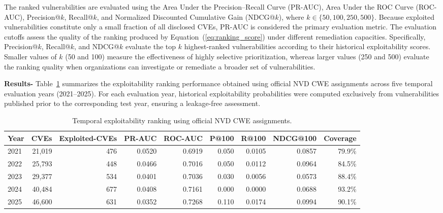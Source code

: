 \documentclass[conference,compsoc]{IEEEtran}
\begin{document}
The ranked vulnerabilities are evaluated using the Area Under the Precision--Recall Curve (PR-AUC), Area Under the ROC Curve (ROC-AUC), Precision@$k$, Recall@$k$, and Normalized Discounted Cumulative Gain (NDCG@$k$), where $k \in \{50,100,250,500\}$. Because exploited vulnerabilities constitute only a small fraction of all disclosed CVEs, PR-AUC is considered the primary evaluation metric. The evaluation cutoffs assess the quality of the ranking produced by Equation~(\ref{eq:ranking_score}) under different remediation capacities. Specifically, Precision@$k$, Recall@$k$, and NDCG@$k$ evaluate the top $k$ highest-ranked vulnerabilities according to their historical exploitability scores. Smaller values of $k$ (50 and 100) measure the effectiveness of highly selective prioritization, whereas larger values (250 and 500) evaluate the ranking quality when organizations can investigate or remediate a broader set of vulnerabilities.


\textbf{Results-} Table~\ref{tab:cwe_ranking} summarizes the exploitability ranking performance obtained using official NVD CWE assignments across five temporal evaluation years (2021--2025). For each evaluation year, historical exploitability probabilities were computed exclusively from vulnerabilities published prior to the corresponding test year, ensuring a leakage-free assessment.

\begin{table}[h]
\centering
\caption{Temporal exploitability ranking using official NVD CWE assignments.}
\label{tab:cwe_ranking}
\scriptsize
\begin{tabular}{lrrrrrrrr}
\toprule
\textbf{Year} &
\textbf{CVEs} &
\textbf{  Exploited-CVEs} &
\textbf{ PR-AUC} &
\textbf{ ROC-AUC} &
\textbf{ P@100} &
\textbf{ R@100} &
\textbf{ NDCG@100} &
\textbf{ Coverage} \\
\midrule
2021 & 21,019 & 476 & 0.0520 & 0.6919 & 0.050 & 0.0105 & 0.0857 & 79.9\% \\
2022 & 25,793 & 448 & 0.0466 & 0.7016 & 0.050 & 0.0112 & 0.0964 & 84.5\% \\
2023 & 29,377 & 534 & 0.0401 & 0.7036 & 0.030 & 0.0056 & 0.0573 & 88.4\% \\
2024 & 40,484 & 677 & 0.0408 & 0.7161 & 0.000 & 0.0000 & 0.0688 & 93.2\% \\
2025 & 46,600 & 631 & 0.0352 & 0.7268 & 0.110 & 0.0174 & 0.0994 & 90.1\% \\
\bottomrule
\end{tabular}
\end{table}
\end{document}

